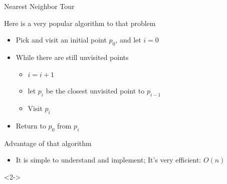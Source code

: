 \begin{frame}{Nearest Neighbor Tour}
  \begin{block}{Here is a very popular algorithm to that problem}
    \begin{itemize}
    \item Pick and visit an initial point $p_0$, and let $i=0$
    \item While there are still unvisited points
      \begin{itemize}
      \item $i=i+1$
      \item let $p_i$ be the closest unvisited point to $p_{i-1}$
      \item Visit $p_i$
      \end{itemize}
    \item Return to $p_0$ from $p_i$
    \end{itemize}
  \end{block}

  \begin{block}{Advantage of that algorithm}
    \begin{itemize}
    \item It is simple to understand and implement; It's very efficient: $O(n)$
    \end{itemize}
  \end{block}
  
  \begin{alertblock}<2->{}
    \begin{minipage}{.6\linewidth}
      \only<2| handout:0>{\texttt{[image: fig/proof\_salesman2.fig]}}%
    \end{minipage}\hfill
    \begin{minipage}{.35\linewidth}
      \begin{center}
      \end{center}
    \end{minipage}
  \end{alertblock}
\end{frame}
